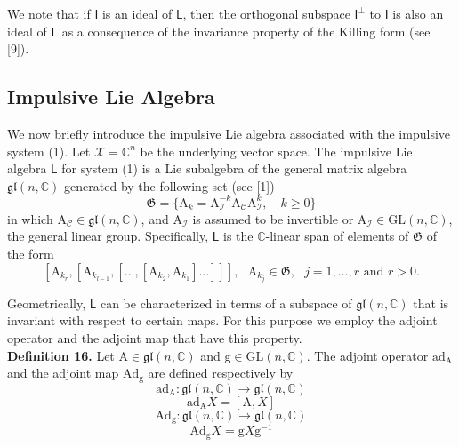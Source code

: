 \documentclass[11pt,a4paper]{article}
\begin{document}
We note that if $\mathsf{I}$ is an ideal of $\mathsf{L}$, then the orthogonal subspace $\mathsf{I}^{\perp}$ to $\mathsf{I}$ is also an ideal of $\mathsf{L}$ as a consequence of the invariance property of the Killing form (see [9]).

%
\subsection{Impulsive Lie Algebra}
\qquad We now briefly introduce the impulsive Lie algebra associated with the impulsive system (1). Let $\mathcal{X} = \mathbb{C}^n$ be the underlying vector space. The impulsive Lie algebra $\mathsf{L}$ for system (1)  is a Lie subalgebra of the general matrix algebra $\mathfrak{gl}(n,\mathbb{C})$ generated by the following set (see [1])
$$
\mathfrak{G}=\{\mathrm{A}_k = \mathrm{A}_\mathcal{I}^{-k}\mathrm{A}_\mathcal{C}\mathrm{A}_\mathcal{I}^k, \quad k \geq 0 \}
$$
in which $\mathrm{A}_\mathcal{C} \in \mathfrak{gl}(n,\mathbb{C})$, and $\mathrm{A}_{\mathcal{I}}$
is assumed to be invertible or $\mathrm{A}_{\mathcal{I}}\in \mathrm{GL}(n,\mathbb{C})$, the general linear group. Specifically, $\mathsf{L}$ is the $\mathbb{C}$-linear span of elements of $\mathfrak{G}$ of the form
$$
[\mathrm{A}_{k_r},[\mathrm{A}_{k_{l-1}},[..., [\mathrm{A}_{k_2},\mathrm{A}_{k_1}]...]]],
\text{  }\mathrm{A}_{k_j} \in \mathfrak{G},
\text{  } j = 1,...,r \text{ and } r>0.
$$

Geometrically, $\mathsf{L}$ can be characterized in terms of a subspace of $\mathfrak{gl}(n,\mathbb{C})$ that is invariant with respect to certain maps. For this purpose we employ the adjoint operator and the adjoint map that have this property. \\

\textbf{Definition 16.} Let $\mathrm{A} \in \mathfrak{gl}(n,\mathbb{C})$ and $\mathrm{g} \in \mathrm{GL}(n,\mathbb{C})$. The adjoint operator $\mathrm{ad}_{\mathrm{A}}$ and the adjoint map $\mathrm{Ad}_{\mathrm{g}}$ are defined respectively by  
$$
\mathrm{ad}_{\mathrm{A}}: \mathfrak{gl}(n,\mathbb{C}) \longrightarrow  \mathfrak{gl}(n,\mathbb{C})
$$
$$
\mathrm{ad}_{\mathrm{A}} X = [\mathrm{A},X]
$$
$$
\mathrm{Ad}_{\mathrm{g}}: \mathfrak{gl}(n,\mathbb{C}) \longrightarrow  \mathfrak{gl}(n,\mathbb{C})
$$
$$
\mathrm{Ad}_{\mathrm{g}} X = \mathrm{g}X\mathrm{g}^{-1}
$$
\end{document}
